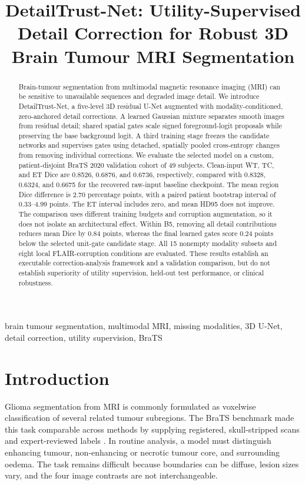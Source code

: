 \documentclass[conference]{IEEEtran}
\title{DetailTrust-Net: Utility-Supervised Detail Correction for Robust 3D Brain Tumour MRI Segmentation}
\author{\IEEEauthorblockN{Samiul Seikh, Vikash Kumar Vivek, Krish Garg, Lakshay Pal, Shena}
\IEEEauthorblockA{Netaji Subhas University of Technology (NSUT), New Delhi, India}}
\begin{document}
\maketitle

\begin{abstract}
Brain-tumour segmentation from multimodal magnetic resonance imaging (MRI) can be sensitive to unavailable sequences and degraded image detail. We introduce DetailTrust-Net, a five-level 3D residual U-Net augmented with modality-conditioned, zero-anchored detail corrections. A learned Gaussian mixture separates smooth images from residual detail; shared spatial gates scale signed foreground-logit proposals while preserving the base background logit. A third training stage freezes the candidate networks and supervises gates using detached, spatially pooled cross-entropy changes from removing individual corrections. We evaluate the selected model on a custom, patient-disjoint BraTS 2020 validation cohort of 49 subjects. Clean-input WT, TC, and ET Dice are 0.8526, 0.6876, and 0.6736, respectively, compared with 0.8328, 0.6324, and 0.6675 for the recovered raw-input baseline checkpoint. The mean region Dice difference is 2.70 percentage points, with a paired patient bootstrap interval of 0.33--4.99 points. The ET interval includes zero, and mean HD95 does not improve. The comparison uses different training budgets and corruption augmentation, so it does not isolate an architectural effect. Within B5, removing all detail contributions reduces mean Dice by 0.84 points, whereas the final learned gates score 0.24 points below the selected unit-gate candidate stage. All 15 nonempty modality subsets and eight local FLAIR-corruption conditions are evaluated. These results establish an executable correction-analysis framework and a validation comparison, but do not establish superiority of utility supervision, held-out test performance, or clinical robustness.
\end{abstract}

\begin{IEEEkeywords}
brain tumour segmentation, multimodal MRI, missing modalities, 3D U-Net, detail correction, utility supervision, BraTS
\end{IEEEkeywords}

\section{Introduction}
Glioma segmentation from MRI is commonly formulated as voxelwise classification of several related tumour subregions. The BraTS benchmark made this task comparable across methods by supplying registered, skull-stripped scans and expert-reviewed labels \cite{menze2015,bakas2017}. In routine analysis, a model must distinguish enhancing tumour, non-enhancing or necrotic tumour core, and surrounding oedema. The task remains difficult because boundaries can be diffuse, lesion sizes vary, and the four image contrasts are not interchangeable.
\end{document}
